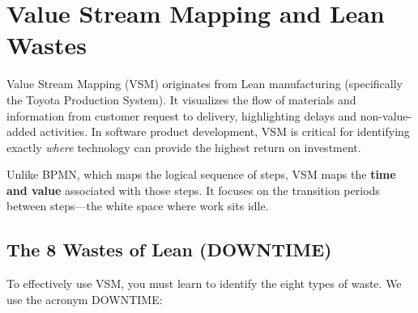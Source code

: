 \documentclass[
  11pt,
  openany,
  oneside]{book}
\begin{document}
\bigskip

\section{Value Stream Mapping and Lean
Wastes}\label{value-stream-mapping-and-lean-wastes}

Value Stream Mapping (VSM) originates from Lean manufacturing
(specifically the Toyota Production System). It visualizes the flow of
materials and information from customer request to delivery,
highlighting delays and non-value-added activities. In software product
development, VSM is critical for identifying exactly \emph{where}
technology can provide the highest return on investment.

Unlike BPMN, which maps the logical sequence of steps, VSM maps the
\textbf{time and value} associated with those steps. It focuses on the
transition periods between steps---the white space where work sits idle.

\subsection{The 8 Wastes of Lean
(DOWNTIME)}\label{the-8-wastes-of-lean-downtime}

To effectively use VSM, you must learn to identify the eight types of
waste. We use the acronym DOWNTIME:
\end{document}
